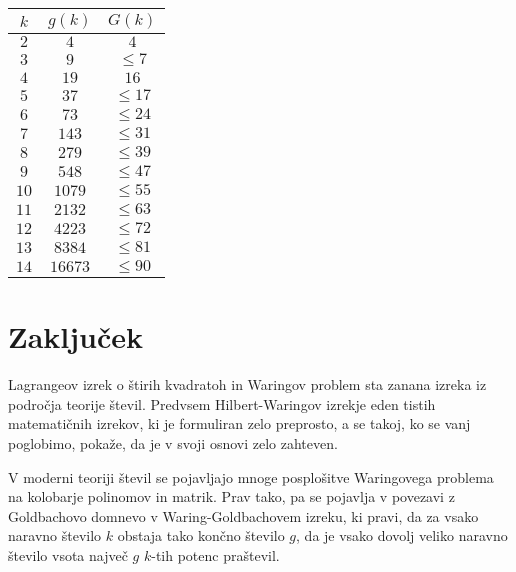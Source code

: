 \documentclass[a4paper]{amsart}
\theoremstyle{definition}
\theoremstyle{plain}
\numberwithin{equation}{section}
\begin{document}
\begin{center}
	\begin{tabular}{|c|c|c|}
	\hline
	$k$ & $g(k)$ & $G(k)$ \\
	\hline
	$2$ & $4$ & $4$ \\
	
	$3$ & $9$ & $\leqslant 7$ \\
	
	$4$ & $19$ &  $16$ \\
	
	$5$ & $37$ & $\leqslant 17 $ \\
	
	$6$ & $73$ & $\leqslant 24$ \\
	
	$7$ & $143$ & $\leqslant 31 $ \\
	
	$8$ & $279$ & $\leqslant 39$ \\
	
	$9$ & $548$ & $\leqslant 47$ \\
	
	$10$ & $1079$ & $\leqslant 55$ \\
	
	$11$ & $2132$ & $\leqslant 63$ \\
	
	$12$ & $4223$ & $\leqslant 72$ \\
	
	$13$ & $8384$ & $\leqslant 81$ \\
	
	$14$ & $16673$ & $\leqslant 90$ \\
	\hline
\end{tabular}
\end{center}


\section{Zaključek}

Lagrangeov izrek o štirih kvadratoh in Waringov problem sta zanana izreka iz področja teorije števil. Predvsem Hilbert-Waringov izrekje eden tistih matematičnih izrekov, ki je formuliran zelo preprosto, a se takoj, ko se vanj poglobimo, pokaže, da je v svoji osnovi zelo zahteven. 

V moderni teoriji števil se pojavljajo mnoge posplošitve Waringovega problema na kolobarje polinomov in matrik. Prav tako, pa se pojavlja v povezavi z Goldbachovo domnevo v Waring-Goldbachovem izreku, ki pravi, da  za vsako naravno število $k$ obstaja tako končno število $g$, da je vsako dovolj veliko naravno število vsota največ $g$ $k$-tih potenc praštevil.


\end{document}
